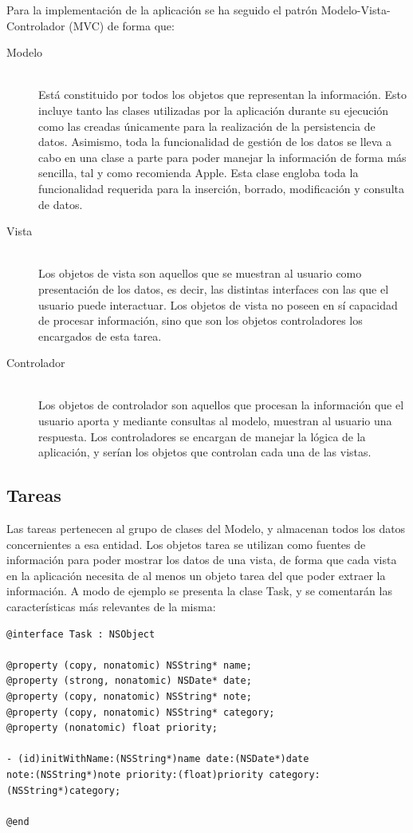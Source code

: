 \documentclass[parskip=half*]{scrartcl}
\begin{document}
Para la implementaci\'on de la aplicaci\'on se ha seguido el patr\'on Modelo-Vista-Controlador (MVC) de forma que:
\begin{description}
	\item[Modelo] \hfill \\ Est\'a constituido por todos los objetos que representan la informaci\'on. Esto incluye tanto las clases utilizadas por la aplicaci\'on durante su ejecuci\'on como las creadas \'unicamente para la realizaci\'on de la persistencia de datos. Asimismo, toda la funcionalidad de gesti\'on de los datos se lleva a cabo en una clase a parte para poder manejar la informaci\'on de forma m\'as sencilla, tal y como recomienda Apple. Esta clase engloba toda la funcionalidad requerida para la inserci\'on, borrado, modificaci\'on y consulta de datos.
	\item[Vista] \hfill \\ Los objetos de vista son aquellos que se muestran al usuario como presentaci\'on de los datos, es decir, las distintas interfaces con las que el usuario puede interactuar. Los objetos de vista no poseen en s\'i capacidad de procesar informaci\'on, sino que son los objetos controladores los encargados de esta tarea.
	\item[Controlador] \hfill \\ Los objetos de controlador son aquellos que procesan la informaci\'on que el usuario aporta y mediante consultas al modelo, muestran al usuario una respuesta. Los controladores se encargan de manejar la l\'ogica de la aplicaci\'on, y ser\'ian los objetos que controlan cada una de las vistas.
\end{description}

\subsection{Tareas}

Las tareas pertenecen al grupo de clases del Modelo, y almacenan todos los datos concernientes a esa entidad. Los objetos tarea se utilizan como fuentes de informaci\'on para poder mostrar los datos de una vista, de forma que cada vista en la aplicaci\'on necesita de al menos un objeto tarea del que poder extraer la informaci\'on. A modo de ejemplo se presenta la clase Task, y se comentar\'an las caracter\'isticas m\'as relevantes de la misma:

\begin{lstlisting}
@interface Task : NSObject

@property (copy, nonatomic) NSString* name;
@property (strong, nonatomic) NSDate* date;
@property (copy, nonatomic) NSString* note;
@property (copy, nonatomic) NSString* category;
@property (nonatomic) float priority;

- (id)initWithName:(NSString*)name date:(NSDate*)date 
note:(NSString*)note priority:(float)priority category:(NSString*)category;

@end
\end{lstlisting}
\end{document}
